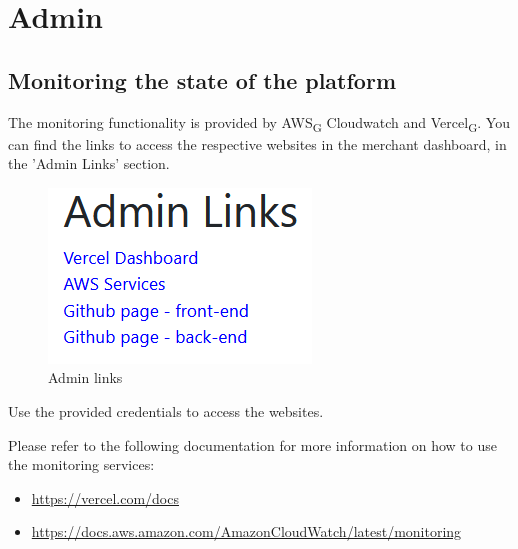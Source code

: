 \section{Admin}
\subsection{Monitoring the state of the platform}
The monitoring functionality is provided by AWS\textsubscript{G} Cloudwatch and Vercel\textsubscript{G}. You can find the links to access the respective websites in the merchant dashboard, in the 'Admin Links' section.

\begin{figure}[H]
\centering
\includegraphics[scale=0.6]{res/Immagini/AdminLinks}
\caption{Admin links}
\end{figure}

Use the provided credentials to access the websites.

Please refer to the following documentation for more information on how to use the monitoring services:
\begin{itemize}
\item \url{https://vercel.com/docs}
\item \url{https://docs.aws.amazon.com/AmazonCloudWatch/latest/monitoring}
\end{itemize}